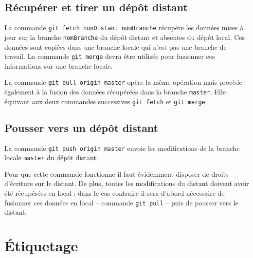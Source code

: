 \documentclass[11pt,twoside,headings=normal,open=right,french,DIV=12]{scrreprt}
\newcommand{\img}[2]{\texttt{[image: \#2]}}
\newcommand{\info}[1]{
    \begin{minipage}{\textwidth}
	    \begin{minipage}[c]{0.1\linewidth}
		    \centering\img{0.1}{../images/info}
        \end{minipage}    
		\begin{minipage}[c]{0.8\linewidth}
		    #1
        \end{minipage}
    \end{minipage}
	}
\begin{document}
  



\subsection{Récupérer et tirer un dépôt distant}        



    La commande \verb|git fetch nonDistant nomBranche| récupère les données mises à jour sur la branche \verb|nomBranche| du dépôt distant et absentes du dépôt local. Ces données sont copiées dans une branche locale qui n'est pas une branche de travail. La commande \verb|git merge| devra être utilisée pour fusionner ces informations sur une branche locale.
    
    La commande \verb|git pull origin master| opère la même opération mais procède également à la fusion des données récupérées dans la branche \verb|master|. Elle équivant aux deux commandes successives \verb|git fetch| et \verb|git merge|.




\subsection{Pousser vers un dépôt distant}    



    La commande \verb|git push origin master| envoie les modifications de la branche locale \verb|master| du dépôt distant.

    
    \smallskip
    
    Pour que cette commande fonctionne il faut évidemment disposer de droits d'écriture sur le distant. De plus, toutes les modifications du distant doivent avoir été récupérées en local : dans le cas contraire il sera d'abord nécessaire de fusionner ces données en local -- commande \verb|git pull| -- puis de pousser vers le distant.



\section{\'Etiquetage}    
\end{document}
